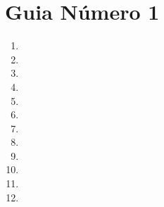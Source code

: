\documentclass[11pt,a4paper]{article} %
\newcommand{\ejercicio}[1]{
	\item 
	
}
\begin{document}
		
\section*{Guia Número 1}
	\begin{enumerate}

	\item 
	
		\ejercicio{02}
		\ejercicio{03}
		\ejercicio{04}
		\ejercicio{05}
		\ejercicio{06}
		\ejercicio{08}
		\ejercicio{09}
		\ejercicio{10}
		\ejercicio{11}
		\ejercicio{12}
		\ejercicio{13}
		
	\end{enumerate}
		
\end{document}
